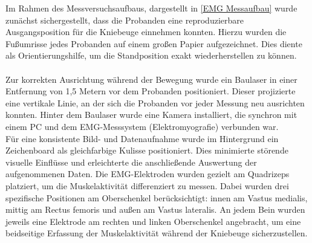Im Rahmen des Messversuchsaufbaus, dargestellt in \autoref{EMG Messaufbau} wurde zunächst sichergestellt, dass die Probanden eine reproduzierbare Ausgangsposition für die Kniebeuge einnehmen konnten. Hierzu wurden die Fußumrisse jedes Probanden auf einem großen Papier aufgezeichnet. Dies diente als Orientierungshilfe, um die Standposition exakt wiederherstellen zu können.\\
\\
Zur korrekten Ausrichtung während der Bewegung wurde ein Baulaser in einer Entfernung von 1,5 Metern vor dem Probanden positioniert. Dieser projizierte eine vertikale Linie, an der sich die Probanden vor jeder Messung neu ausrichten konnten. Hinter dem Baulaser wurde eine Kamera installiert, die synchron mit einem PC und dem EMG-Messsystem (Elektromyografie) verbunden war.\\
Für eine konsistente Bild- und Datenaufnahme wurde im Hintergrund ein Zeichenboard als gleichfarbige Kulisse positioniert. Dies minimierte störende visuelle Einflüsse und erleichterte die anschließende Auswertung der aufgenommenen Daten.
Die EMG-Elektroden wurden gezielt am Quadrizeps platziert, um die Muskelaktivität differenziert zu messen. Dabei wurden drei spezifische Positionen am Oberschenkel berücksichtigt: innen am Vastus medialis, mittig am Rectus femoris und außen am Vastus lateralis. An jedem Bein wurden jeweils eine Elektrode am rechten und linken Oberschenkel angebracht, um eine beidseitige Erfassung der Muskelaktivität während der Kniebeuge sicherzustellen.

